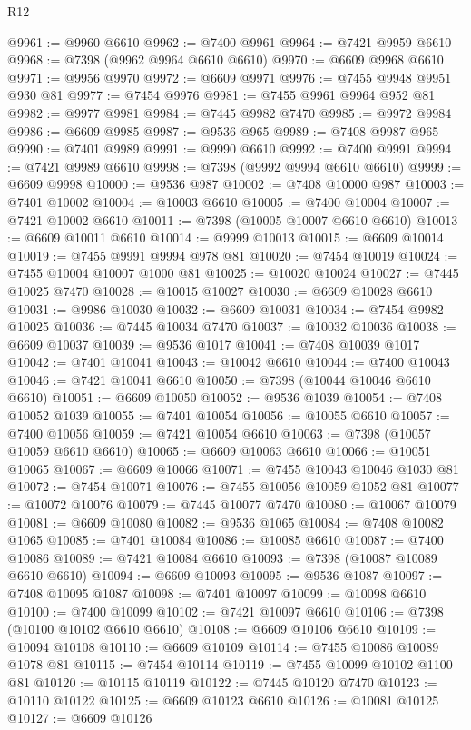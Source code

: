 \begin{lexlean}{R12}
\begin{coremodule}
@9961 := @9960 @6610
@9962 := @7400 @9961
@9964 := @7421 @9959 @6610
@9968 := @7398 (@9962 @9964 @6610 @6610)
@9970 := @6609 @9968 @6610
@9971 := @9956 @9970
@9972 := @6609 @9971
@9976 := @7455 @9948 @9951 @930 @81
@9977 := @7454 @9976
@9981 := @7455 @9961 @9964 @952 @81
@9982 := @9977 @9981
@9984 := @7445 @9982 @7470
@9985 := @9972 @9984
@9986 := @6609 @9985
@9987 := @9536 @965
@9989 := @7408 @9987 @965
@9990 := @7401 @9989
@9991 := @9990 @6610
@9992 := @7400 @9991
@9994 := @7421 @9989 @6610
@9998 := @7398 (@9992 @9994 @6610 @6610)
@9999 := @6609 @9998
@10000 := @9536 @987
@10002 := @7408 @10000 @987
@10003 := @7401 @10002
@10004 := @10003 @6610
@10005 := @7400 @10004
@10007 := @7421 @10002 @6610
@10011 := @7398 (@10005 @10007 @6610 @6610)
@10013 := @6609 @10011 @6610
@10014 := @9999 @10013
@10015 := @6609 @10014
@10019 := @7455 @9991 @9994 @978 @81
@10020 := @7454 @10019
@10024 := @7455 @10004 @10007 @1000 @81
@10025 := @10020 @10024
@10027 := @7445 @10025 @7470
@10028 := @10015 @10027
@10030 := @6609 @10028 @6610
@10031 := @9986 @10030
@10032 := @6609 @10031
@10034 := @7454 @9982 @10025
@10036 := @7445 @10034 @7470
@10037 := @10032 @10036
@10038 := @6609 @10037
@10039 := @9536 @1017
@10041 := @7408 @10039 @1017
@10042 := @7401 @10041
@10043 := @10042 @6610
@10044 := @7400 @10043
@10046 := @7421 @10041 @6610
@10050 := @7398 (@10044 @10046 @6610 @6610)
@10051 := @6609 @10050
@10052 := @9536 @1039
@10054 := @7408 @10052 @1039
@10055 := @7401 @10054
@10056 := @10055 @6610
@10057 := @7400 @10056
@10059 := @7421 @10054 @6610
@10063 := @7398 (@10057 @10059 @6610 @6610)
@10065 := @6609 @10063 @6610
@10066 := @10051 @10065
@10067 := @6609 @10066
@10071 := @7455 @10043 @10046 @1030 @81
@10072 := @7454 @10071
@10076 := @7455 @10056 @10059 @1052 @81
@10077 := @10072 @10076
@10079 := @7445 @10077 @7470
@10080 := @10067 @10079
@10081 := @6609 @10080
@10082 := @9536 @1065
@10084 := @7408 @10082 @1065
@10085 := @7401 @10084
@10086 := @10085 @6610
@10087 := @7400 @10086
@10089 := @7421 @10084 @6610
@10093 := @7398 (@10087 @10089 @6610 @6610)
@10094 := @6609 @10093
@10095 := @9536 @1087
@10097 := @7408 @10095 @1087
@10098 := @7401 @10097
@10099 := @10098 @6610
@10100 := @7400 @10099
@10102 := @7421 @10097 @6610
@10106 := @7398 (@10100 @10102 @6610 @6610)
@10108 := @6609 @10106 @6610
@10109 := @10094 @10108
@10110 := @6609 @10109
@10114 := @7455 @10086 @10089 @1078 @81
@10115 := @7454 @10114
@10119 := @7455 @10099 @10102 @1100 @81
@10120 := @10115 @10119
@10122 := @7445 @10120 @7470
@10123 := @10110 @10122
@10125 := @6609 @10123 @6610
@10126 := @10081 @10125
@10127 := @6609 @10126

\end{coremodule}
\end{lexlean}
